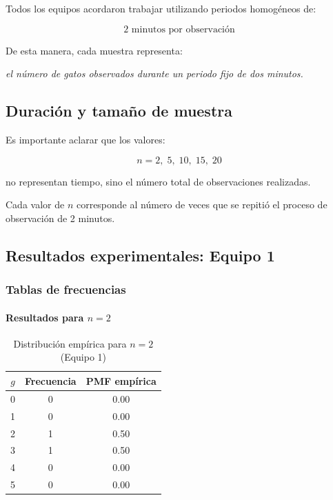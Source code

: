 Todos los equipos acordaron trabajar utilizando periodos homogéneos de:

\[
\boxed{2 \text{ minutos por observación}}
\]

De esta manera, cada muestra representa:

\begin{center}
\textit{el número de gatos observados durante un periodo fijo de dos minutos.}
\end{center}

\subsection{Duración y tamaño de muestra}

Es importante aclarar que los valores:

\[
n = 2,\; 5,\; 10,\; 15,\; 20
\]

no representan tiempo, sino el número total de observaciones realizadas.

Cada valor de \(n\) corresponde al número de veces que se repitió el proceso de observación de 2 minutos.

\subsection{Resultados experimentales: Equipo 1}

\subsubsection{Tablas de frecuencias}

\paragraph{\texorpdfstring{Resultados para \(n=2\)}{Resultados para n=2}}

\begin{table}[H]
\centering
\begin{tabular}{ccc}
\toprule
\(g\) & Frecuencia & PMF empírica \\
\midrule
0 & 0 & 0.00 \\
1 & 0 & 0.00 \\
2 & 1 & 0.50 \\
3 & 1 & 0.50 \\
4 & 0 & 0.00 \\
5 & 0 & 0.00 \\
\bottomrule
\end{tabular}
\caption{Distribución empírica para \(n=2\) (Equipo 1)}
\end{table}

